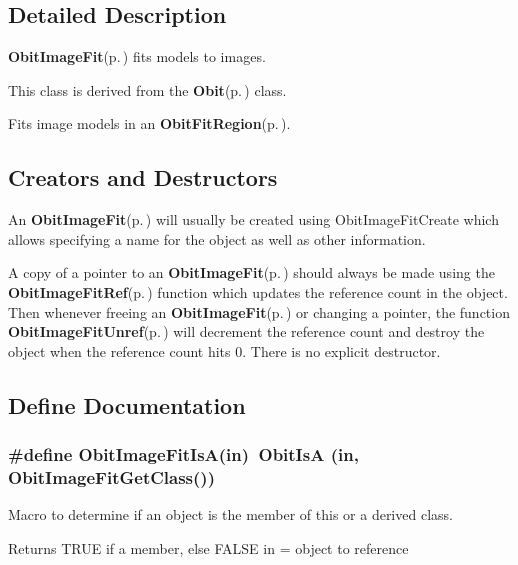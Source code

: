 \subsection{Detailed Description}
{\bf Obit\-Image\-Fit}{\rm (p.\,\pageref{structObitImageFit})} fits models to images. 

This class is derived from the {\bf Obit}{\rm (p.\,\pageref{structObit})} class.

Fits image models in an {\bf Obit\-Fit\-Region}{\rm (p.\,\pageref{structObitFitRegion})}.\subsection{Creators and Destructors}\label{ObitImageFit_8h_ObitImageFitaccess}
An {\bf Obit\-Image\-Fit}{\rm (p.\,\pageref{structObitImageFit})} will usually be created using Obit\-Image\-Fit\-Create which allows specifying a name for the object as well as other information.

A copy of a pointer to an {\bf Obit\-Image\-Fit}{\rm (p.\,\pageref{structObitImageFit})} should always be made using the {\bf Obit\-Image\-Fit\-Ref}{\rm (p.\,\pageref{ObitImageFit_8h_a1})} function which updates the reference count in the object. Then whenever freeing an {\bf Obit\-Image\-Fit}{\rm (p.\,\pageref{structObitImageFit})} or changing a pointer, the function {\bf Obit\-Image\-Fit\-Unref}{\rm (p.\,\pageref{ObitImageFit_8h_a0})} will decrement the reference count and destroy the object when the reference count hits 0. There is no explicit destructor.

\subsection{Define Documentation}
\subsubsection{\setlength{\rightskip}{0pt plus 5cm}\#define Obit\-Image\-Fit\-Is\-A(in)\ Obit\-Is\-A (in, Obit\-Image\-Fit\-Get\-Class())}\label{ObitImageFit_8h_a2}


Macro to determine if an object is the member of this or a derived class. 

Returns TRUE if a member, else FALSE in = object to reference 
